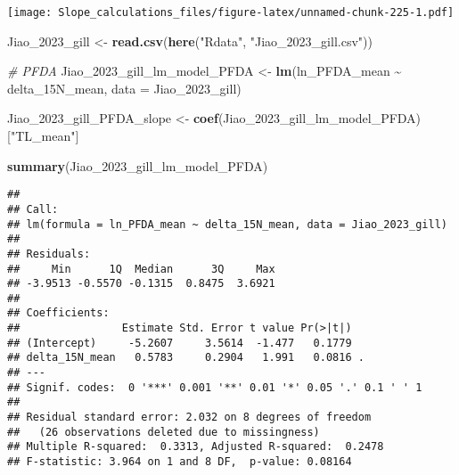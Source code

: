 \documentclass[
]{article}
\newenvironment{Shaded}{\begin{snugshade}}{\end{snugshade}}
\newcommand{\AttributeTok}[1]{\textcolor[rgb]{0.13,0.29,0.53}{#1}}
\newcommand{\CommentTok}[1]{\textcolor[rgb]{0.56,0.35,0.01}{\textit{#1}}}
\newcommand{\FunctionTok}[1]{\textcolor[rgb]{0.13,0.29,0.53}{\textbf{#1}}}
\newcommand{\NormalTok}[1]{#1}
\newcommand{\OtherTok}[1]{\textcolor[rgb]{0.56,0.35,0.01}{#1}}
\newcommand{\SpecialCharTok}[1]{\textcolor[rgb]{0.81,0.36,0.00}{\textbf{#1}}}
\newcommand{\StringTok}[1]{\textcolor[rgb]{0.31,0.60,0.02}{#1}}
\begin{document}
\texttt{[image: Slope\_calculations\_files/figure-latex/unnamed-chunk-225-1.pdf]}

\begin{Shaded}
\begin{Highlighting}[]
\NormalTok{Jiao\_2023\_gill }\OtherTok{\textless{}{-}} \FunctionTok{read.csv}\NormalTok{(}\FunctionTok{here}\NormalTok{(}\StringTok{"Rdata"}\NormalTok{, }\StringTok{"Jiao\_2023\_gill.csv"}\NormalTok{))}

\CommentTok{\# PFDA}
\NormalTok{Jiao\_2023\_gill\_lm\_model\_PFDA }\OtherTok{\textless{}{-}} \FunctionTok{lm}\NormalTok{(ln\_PFDA\_mean }\SpecialCharTok{\textasciitilde{}}\NormalTok{ delta\_15N\_mean,}
                                    \AttributeTok{data =}\NormalTok{ Jiao\_2023\_gill)}

\NormalTok{Jiao\_2023\_gill\_PFDA\_slope }\OtherTok{\textless{}{-}} \FunctionTok{coef}\NormalTok{(Jiao\_2023\_gill\_lm\_model\_PFDA)[}\StringTok{"TL\_mean"}\NormalTok{]}

\FunctionTok{summary}\NormalTok{(Jiao\_2023\_gill\_lm\_model\_PFDA)}
\end{Highlighting}
\end{Shaded}

\begin{verbatim}
## 
## Call:
## lm(formula = ln_PFDA_mean ~ delta_15N_mean, data = Jiao_2023_gill)
## 
## Residuals:
##     Min      1Q  Median      3Q     Max 
## -3.9513 -0.5570 -0.1315  0.8475  3.6921 
## 
## Coefficients:
##                Estimate Std. Error t value Pr(>|t|)  
## (Intercept)     -5.2607     3.5614  -1.477   0.1779  
## delta_15N_mean   0.5783     0.2904   1.991   0.0816 .
## ---
## Signif. codes:  0 '***' 0.001 '**' 0.01 '*' 0.05 '.' 0.1 ' ' 1
## 
## Residual standard error: 2.032 on 8 degrees of freedom
##   (26 observations deleted due to missingness)
## Multiple R-squared:  0.3313, Adjusted R-squared:  0.2478 
## F-statistic: 3.964 on 1 and 8 DF,  p-value: 0.08164
\end{verbatim}
\end{document}
